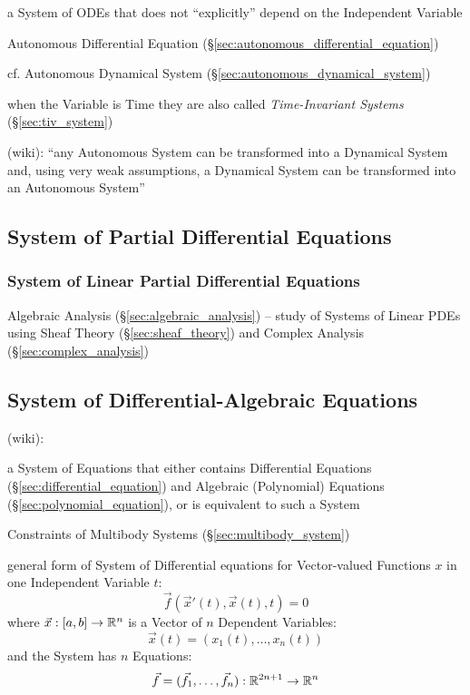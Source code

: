 a System of ODEs that does not ``explicitly'' depend on the Independent Variable

Autonomous Differential Equation (\S\ref{sec:autonomous_differential_equation})

cf. Autonomous Dynamical System (\S\ref{sec:autonomous_dynamical_system})

when the Variable is Time they are also called \emph{Time-Invariant Systems}
(\S\ref{sec:tiv_system})

(wiki): ``any Autonomous System can be transformed into a Dynamical System and,
using very weak assumptions, a Dynamical System can be transformed into an
Autonomous System''



\subsection{System of Partial Differential Equations}\label{sec:pde_system}

\subsubsection{System of Linear Partial Differential Equations}
\label{sec:linear_pde_system}

\fist Algebraic Analysis (\S\ref{sec:algebraic_analysis}) -- study of Systems of
Linear PDEs using Sheaf Theory (\S\ref{sec:sheaf_theory}) and Complex Analysis
(\S\ref{sec:complex_analysis})



\subsection{System of Differential-Algebraic Equations}\label{sec:dae_system}

(wiki):

a System of Equations that either contains Differential Equations
(\S\ref{sec:differential_equation}) and Algebraic (Polynomial) Equations
(\S\ref{sec:polynomial_equation}), or is equivalent to such a System

\fist Constraints of Multibody Systems (\S\ref{sec:multibody_system})

general form of System of Differential equations for Vector-valued Functions
$x$ in one Independent Variable $t$:
\[
  \vec{f}(\vec{x}'(t), \vec{x}(t), t) = 0
\]
where $\vec{x} : [a,b] \rightarrow \mathbb{R}^n$ is a Vector of $n$ Dependent
Variables:
\[
  \vec{x}(t) = (x_1(t), \ldots, x_n(t))
\]
and the System has $n$ Equations:
\[
  \vec{f} = (\vec{f}_1, \ldots, \vec{f}_n) : \mathbb{R}^{2n+1} \rightarrow \mathbb{R}^n
\]

